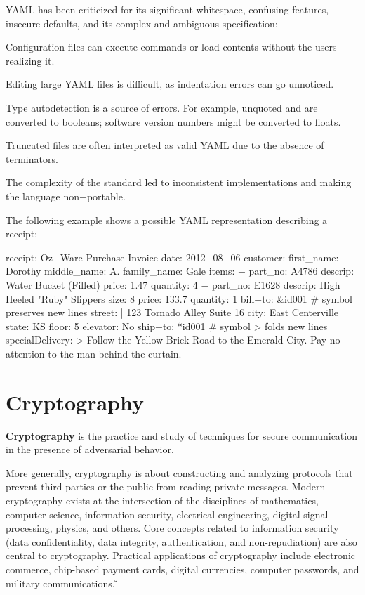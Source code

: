 YAML has been criticized for its significant whitespace, confusing features, insecure defaults, and its complex and
ambiguous specification:
\bit
\item Configuration files can execute commands or load contents without the users realizing it.
\item Editing large YAML files is difficult, as indentation errors can go unnoticed.
\item Type autodetection is a source of errors. For example, unquoted  and  are converted to
booleans; software version numbers might be converted to floats.
\item Truncated files are often interpreted as valid YAML due to the absence of terminators.
\item The complexity of the standard led to inconsistent implementations and making the language non$-$portable.
\eit

The following example shows a possible YAML representation describing a receipt:

\begin{block}
receipt: Oz$-$Ware Purchase Invoice
date: 2012$-$08$-$06
customer:
    first_name: Dorothy
    middle_name: A\@.
    family_name: Gale
items:
    $-$ part_no: A4786
      descrip: Water Bucket (Filled)
      price: 1.47
      quantity: 4
    $-$ part_no: E1628
      descrip: High Heeled "Ruby" Slippers
      size: 8
      price: 133.7
      quantity: 1
bill$-$to:  &id001
    # symbol | preserves new lines
    street: |
            123 Tornado Alley
            Suite 16
    city: East Centerville
    state: KS
    floor: 5
    elevator: No
ship$-$to:  *id001
# symbol > folds new lines
specialDelivery:  >
    Follow the Yellow Brick
    Road to the Emerald City.
    Pay no attention to the
    man behind the curtain.
\end{block}

\section{Cryptography}

\bd[Cryptography]
\textbf{Cryptography} is the practice and study of techniques for secure communication in the presence of adversarial
behavior.
\ed

More generally, cryptography is about constructing and analyzing protocols that prevent third parties or the public
from reading private messages. Modern cryptography exists at the intersection of the disciplines of mathematics,
computer science, information security, electrical engineering, digital signal processing, physics, and others. Core
concepts related to information security (data confidentiality, data integrity, authentication, and non-repudiation)
are also central to cryptography. Practical applications of cryptography include electronic commerce, chip-based
payment cards, digital currencies, computer passwords, and military communications. \v

